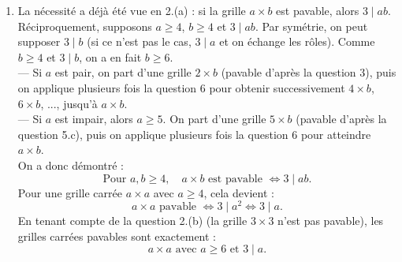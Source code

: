 \begin{enumerate}
\item La nécessité a déjà été vue en 2.(a) : si la grille $a \times b$ est pavable, alors $3 \mid ab$. \\
Réciproquement, supposons $a \geqslant 4$, $b \geqslant 4$ et $3 \mid ab$. Par symétrie, on peut supposer $3 \mid b$ (si ce n'est pas le cas, $3 \mid a$ et on échange les rôles). Comme $b \geqslant 4$ et $3 \mid b$, on a en fait $b \geqslant 6$. \\
— Si $a$ est pair, on part d'une grille $2 \times b$ (pavable d'après la question 3), puis on applique plusieurs fois la question 6 pour obtenir successivement $4 \times b$, $6 \times b$, ..., jusqu'à $a \times b$. \\
— Si $a$ est impair, alors $a \geqslant 5$. On part d'une grille $5 \times b$ (pavable d'après la question 5.c), puis on applique plusieurs fois la question 6 pour atteindre $a \times b$. \\
On a donc démontré :
\[
\boxed{\text{Pour } a, b \geqslant 4,\quad a \times b \text{ est pavable } \iff 3 \mid ab.}
\]
Pour une grille carrée $a \times a$ avec $a \geqslant 4$, cela devient :
\[
a \times a \text{ pavable } \iff 3 \mid a^2 \iff 3 \mid a.
\]
En tenant compte de la question 2.(b) (la grille $3 \times 3$ n'est pas pavable), les grilles carrées pavables sont exactement :
\[
\boxed{a \times a \text{ avec } a \geqslant 6 \text{ et } 3 \mid a.}
\]
\end{enumerate}
